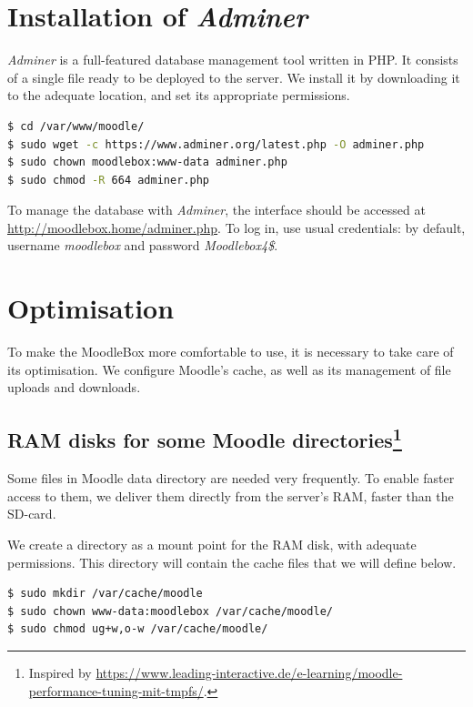 \documentclass[12pt]{article}
\begin{document}
\section{Installation of \textsl{Adminer}}

\textsl{Adminer} is a full-featured database management tool written in PHP. It consists of a single file ready to be deployed to the server.
We install it by downloading it to the adequate location, and set its appropriate permissions.
\begin{lstlisting}[language=bash]
$ cd /var/www/moodle/
$ sudo wget -c https://www.adminer.org/latest.php -O adminer.php
$ sudo chown moodlebox:www-data adminer.php
$ sudo chmod -R 664 adminer.php
\end{lstlisting}

To manage the database with \textsl{Adminer}, the interface should be accessed at \url{http://moodlebox.home/adminer.php}.
To log in, use usual credentials: by default, username \emph{moodlebox} and password \emph{Moodlebox4\$}.

\section{Optimisation}\label{sec-optimisation}

To make the MoodleBox more comfortable to use, it is necessary to take care of its optimisation.
We configure Moodle's cache, as well as its management of file uploads and downloads.

\subsection[RAM disks for some Moodle directories]{RAM disks for some Moodle directories\footnote{Inspired by \url{https://www.leading-interactive.de/e-learning/moodle-performance-tuning-mit-tmpfs/}.}}

Some files in Moodle data directory are needed very frequently.
To enable faster access to them, we deliver them directly from the server's RAM, faster than the SD-card.

We create a directory as a mount point for the RAM disk, with adequate permissions.
This directory will contain the cache files that we will define below. 
\begin{lstlisting}[language=bash]
$ sudo mkdir /var/cache/moodle
$ sudo chown www-data:moodlebox /var/cache/moodle/
$ sudo chmod ug+w,o-w /var/cache/moodle/
\end{lstlisting}
\end{document}
